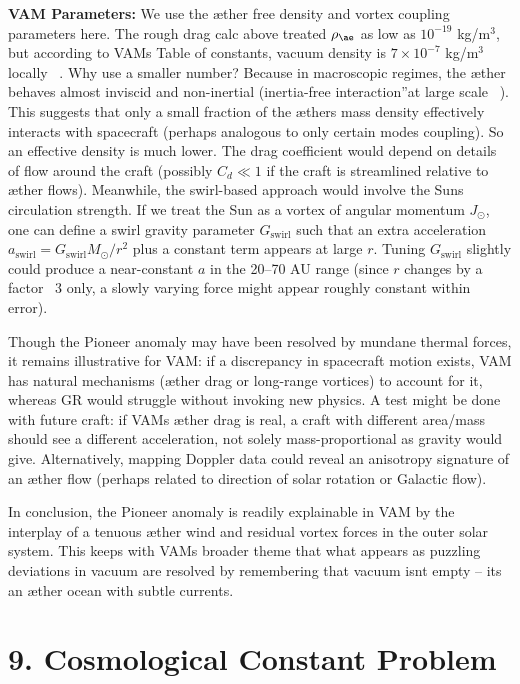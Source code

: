\documentclass[a4paper, aps,preprint,superscriptaddress, 12pt]{revtex4}
\begin{document}
\textbf{VAM Parameters:} We use the æther free density and vortex coupling parameters here. The rough drag calc above treated $\rho_{\ae}$ as low as $10^{-19}$ kg/m$^3$, but according to VAM\rqs s Table of constants, vacuum density is $7\times10^{-7}$ kg/m$^3$ locally~\cite{VAM_constants} . Why use a smaller number? Because in macroscopic regimes, the æther behaves almost inviscid and non-inertial (\grqq inertia-free interaction\textquotedblright at large scale~\cite{Iskandarani2025b} ). This suggests that only a small fraction of the æther\rqs s mass density effectively interacts with spacecraft (perhaps analogous to only certain modes coupling). So an effective density is much lower. The drag coefficient would depend on details of flow around the craft (possibly $C_d\ll1$ if the craft is streamlined relative to æther flows). Meanwhile, the swirl-based approach would involve the Sun\rqs s circulation strength. If we treat the Sun as a vortex of angular momentum $J_\odot$, one can define a swirl gravity parameter $G_{\text{swirl}}$ such that an extra acceleration $a_{\text{swirl}} = G_{\text{swirl}} M_\odot/r^2$ plus a constant term appears at large $r$. Tuning $G_{\text{swirl}}$ slightly could produce a near-constant $a$ in the 20–70 AU range (since $r$ changes by a factor ~3 only, a slowly varying force might appear roughly constant within error).


Though the Pioneer anomaly may have been resolved by mundane thermal forces, it remains illustrative for VAM: if a discrepancy in spacecraft motion exists, VAM has natural mechanisms (æther drag or long-range vortices) to account for it, whereas GR would struggle without invoking new physics. A test might be done with future craft: if VAM\rqs s æther drag is real, a craft with different area/mass should see a different acceleration, not solely mass-proportional as gravity would give. Alternatively, mapping Doppler data could reveal an anisotropy signature of an æther flow (perhaps related to direction of solar rotation or Galactic flow).


In conclusion, the Pioneer anomaly is readily explainable in VAM by the interplay of a tenuous æther wind and residual vortex forces in the outer solar system. This keeps with VAM\rqs s broader theme that what appears as puzzling deviations in vacuum are resolved by remembering that vacuum isn\rqs t empty – it\rqs s an æther ocean with subtle currents.


\section*{9. Cosmological Constant Problem}
\end{document}
